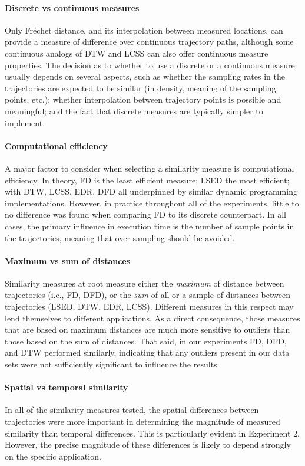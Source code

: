 \documentclass{interact}
\begin{document}
\paragraph*{Discrete vs continuous measures} Only Fréchet distance, and its interpolation between measured locations, can provide a measure of difference over continuous trajectory paths, although some continuous analogs of DTW and LCSS can also offer continuous measure properties. The decision as to whether to use a discrete or a continuous measure usually depends on several aspects, such as whether the sampling rates in the trajectories are expected to be similar (in density, meaning of the sampling points, etc.); whether interpolation between trajectory points is possible and meaningful; and the fact that discrete measures are typically simpler to implement.

\paragraph*{Computational efficiency} A major factor to consider when selecting a similarity measure is computational efficiency. In theory, FD is the least efficient measure; LSED the most efficient; with DTW, LCSS, EDR, DFD all underpinned by similar dynamic programming implementations. However, in practice throughout all of the experiments, little to no difference was found when comparing FD to its discrete counterpart. In all cases, the primary influence in execution time is the number of sample points in the trajectories, meaning that over-sampling should be avoided.

\paragraph*{Maximum vs sum of distances} %
Similarity measures at root measure either the \textit{maximum} of distance between trajectories (i.e., FD, DFD), or the \textit{sum} of all or a sample of distances  between trajectories (LSED, DTW, EDR, LCSS). Different measures in this respect may lend themselves to different applications. As a direct consequence, those measures that are based on maximum distances are much more sensitive to outliers than those based on the sum of distances. That said, in our experiments FD, DFD, and DTW performed similarly, indicating that any outliers present in our data sets were not sufficiently significant to influence the results.
 	
\paragraph*{Spatial vs temporal similarity}
In all of the similarity measures tested, the spatial differences between trajectories were more important in determining the magnitude of measured similarity than temporal differences. This is particularly evident in Experiment 2. However, the precise  magnitude of these differences is likely to depend strongly on the specific application.
\end{document}
